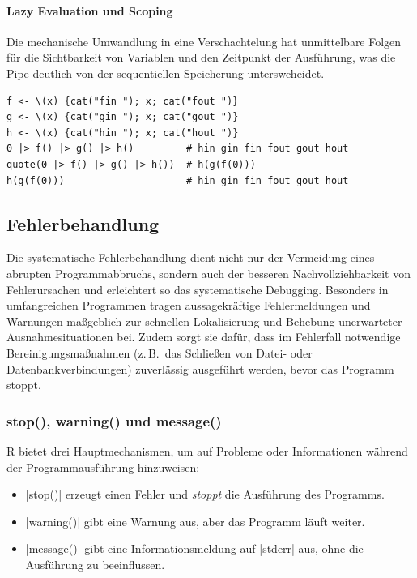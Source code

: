 \documentclass[10pt,twocolumn]{scrartcl}
\renewcommand{\lstinline}{\mycoloredinline}
\begin{document}
\paragraph{Lazy Evaluation und Scoping}

Die mechanische Umwandlung in eine Verschachtelung hat unmittelbare Folgen für die Sichtbarkeit von Variablen und den Zeitpunkt der Ausführung, was die Pipe deutlich von der sequentiellen Speicherung unterswcheidet.

\begin{lstlisting}
f <- \(x) {cat("fin "); x; cat("fout ")}
g <- \(x) {cat("gin "); x; cat("gout ")}
h <- \(x) {cat("hin "); x; cat("hout ")}
0 |> f() |> g() |> h()         # hin gin fin fout gout hout
quote(0 |> f() |> g() |> h())  # h(g(f(0)))
h(g(f(0)))                     # hin gin fin fout gout hout
\end{lstlisting}


\subsection{Fehlerbehandlung}

Die systematische Fehlerbehandlung dient nicht nur der Vermeidung eines abrupten Programmabbruchs, sondern auch der besseren Nachvollziehbarkeit von Fehlerursachen und erleichtert so das systematische Debugging. Besonders in umfangreichen Programmen tragen aussagekräftige Fehlermeldungen und Warnungen maßgeblich zur schnellen Lokalisierung und Behebung unerwarteter Ausnahmesituationen bei. Zudem sorgt sie dafür, dass im Fehlerfall notwendige Bereinigungsmaßnahmen (z.\,B.\ das Schließen von Datei- oder Datenbankverbindungen) zuverlässig ausgeführt werden, bevor das Programm stoppt.

\subsubsection{stop(), warning() und message()}

R bietet drei Hauptmechanismen, um auf Probleme oder Informationen während der Programmausführung hinzuweisen:

\begin{itemize}
\item \lstinline|stop()| erzeugt einen Fehler und \emph{stoppt} die Ausführung des Programms.
\item \lstinline|warning()| gibt eine Warnung aus, aber das Programm läuft weiter.
\item \lstinline|message()| gibt eine Informationsmeldung auf \lstinline|stderr| aus, ohne die Ausführung zu beeinflussen.
\end{itemize}
\end{document}
